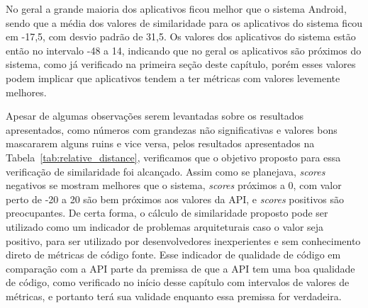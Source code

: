 No geral a grande maioria dos aplicativos ficou melhor que o sistema Android, sendo que a média dos valores de similaridade para os aplicativos do sistema ficou em -17,5, com desvio padrão de 31,5. Os valores dos aplicativos do sistema estão então no intervalo -48 a 14, indicando que no geral os aplicativos são próximos do sistema, como já verificado na primeira seção deste capítulo, porém esses valores podem implicar que aplicativos tendem a ter métricas com valores levemente melhores.

Apesar de algumas observações serem levantadas sobre os resultados apresentados, como números com grandezas não significativas e valores bons mascararem alguns ruins e vice versa, pelos resultados apresentados na Tabela~\ref{tab:relative_distance}, verificamos que o objetivo proposto para essa verificação de similaridade foi alcançado. Assim como se planejava, \textit{scores} negativos se mostram melhores que o sistema, \textit{scores} próximos a 0, com valor perto de -20 a 20 são bem próximos aos valores da API, e \textit{scores} positivos são preocupantes. De certa forma, o cálculo de similaridade proposto pode ser utilizado como um indicador de problemas arquiteturais caso o valor seja positivo, para ser utilizado por desenvolvedores inexperientes e sem conhecimento direto de métricas de código fonte. Esse indicador de qualidade de código em comparação com a API parte da premissa de que a API tem uma boa qualidade de código, como verificado no início desse capítulo com intervalos de valores de métricas, e portanto terá sua validade enquanto essa premissa for verdadeira.